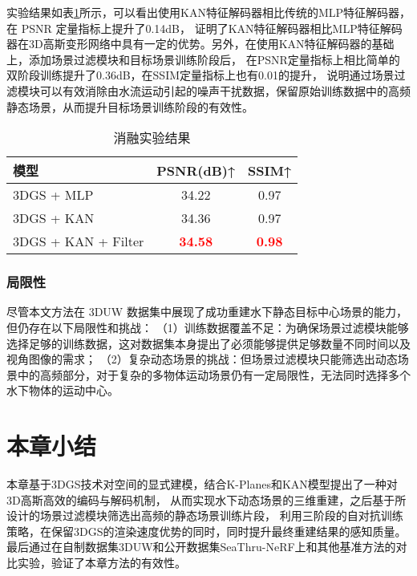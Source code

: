 实验结果如表\ref{tab:recon_ablation}所示，可以看出使用KAN特征解码器相比传统的MLP特征解码器，在 PSNR 定量指标上提升了0.14dB，
证明了KAN特征解码器相比MLP特征解码器在3D高斯变形网络中具有一定的优势。另外，在使用KAN特征解码器的基础上，添加场景过滤模块和目标场景训练阶段后，
在PSNR定量指标上相比简单的双阶段训练提升了0.36dB，在SSIM定量指标上也有0.01的提升，
说明通过场景过滤模块可以有效消除由水流运动引起的噪声干扰数据，保留原始训练数据中的高频静态场景，从而提升目标场景训练阶段的有效性。

\begin{table}
    \centering
    \caption{消融实验结果}
    \label{tab:recon_ablation}
    \begin{tabular}{lcc}
        \toprule
        模型 & PSNR(dB)↑ & SSIM↑ \\
        \midrule
        3DGS + MLP & 34.22 & 0.97 \\
        3DGS + KAN & 34.36 & 0.97\\
        3DGS + KAN + Filter & \textcolor{red}{\textbf{34.58}} & \textcolor{red}{\textbf{0.98}} \\
        \bottomrule
    \end{tabular}
\end{table}


\subsubsection{局限性}
尽管本文方法在 3DUW 数据集中展现了成功重建水下静态目标中心场景的能力，但仍存在以下局限性和挑战：
（1）训练数据覆盖不足：为确保场景过滤模块能够选择足够的训练数据，这对数据集本身提出了必须能够提供足够数量不同时间以及视角图像的需求；
（2）复杂动态场景的挑战：但场景过滤模块只能筛选出动态场景中的高频部分，对于复杂的多物体运动场景仍有一定局限性，无法同时选择多个水下物体的运动中心。

\section{本章小结}
本章基于3DGS技术对空间的显式建模，结合K-Planes和KAN模型提出了一种对3D高斯高效的编码与解码机制，
从而实现水下动态场景的三维重建，之后基于所设计的场景过滤模块筛选出高频的静态场景训练片段，
利用三阶段的自对抗训练策略，在保留3DGS的渲染速度优势的同时，同时提升最终重建结果的感知质量。
最后通过在自制数据集3DUW和公开数据集SeaThru-NeRF上和其他基准方法的对比实验，验证了本章方法的有效性。


